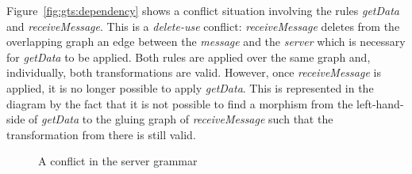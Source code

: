\begin{example}
  Figure~\ref{fig:gts:dependency} shows a conflict situation involving the rules \emph{getData} and \emph{receiveMessage}. This is a \emph{delete-use} conflict: \emph{receiveMessage} deletes from the overlapping graph an edge between the \emph{message} and the \emph{server} which is necessary for \emph{getData} to be applied. Both rules are applied over the same graph and, individually, both transformations are valid. However, once \emph{receiveMessage} is applied, it is no longer possible to
  apply \emph{getData}. This is represented in the diagram by the fact that it is not possible to find a morphism from the left-hand-side of \emph{getData} to the gluing graph of \emph{receiveMessage} such that the transformation from there is still valid.

\begin{figure}[!ht]
  \centering
  \caption{A conflict in the server grammar}\label{fig:gts:conflict}
\end{figure}

\end{example}
